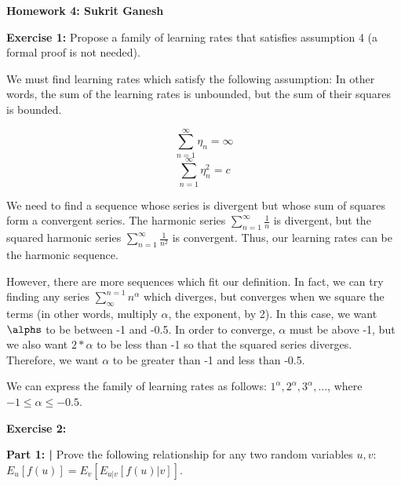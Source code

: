\documentclass{article}
\begin{document}
 
 \begin{center}
     \Huge\textbf{Homework 4: Sukrit Ganesh}\par
 \end{center}
 
  \noindent\makebox[\linewidth]{\rule{\paperwidth}{0.4pt}}\newline
 
 \begin{center}
      \Large\textbf{Exercise 1: }Propose a family of learning rates that satisfies assumption 4 (a formal proof is not needed).\par
 \end{center}
 
 We must find learning rates which satisfy the following assumption:  In other words, the sum of the learning rates is unbounded, but the sum of their
 squares is bounded.
 
 \[\sum_{n=1}^{\infty}{\eta}_{n}=\infty\]
 \[\sum_{n=1}^{\infty}{\eta}_{n}^2=c\]

 We need to find a sequence whose series is divergent but whose sum of squares form a convergent series. The harmonic series $\sum_{n=1}^{\infty}\frac{1}{n}$ is divergent, but the squared harmonic series $\sum_{n=1}^{\infty}\frac{1}{n^2}$ is convergent. Thus, our learning rates can be the harmonic sequence.
 
 However, there are more sequences which fit our definition. In fact, we can try finding any series $\sum^{n=1}_{\infty}n^{\alpha}$ which diverges, but converges when we square the terms (in other words, multiply $\alpha$, the exponent, by 2). In this case, we want $\alphs$ to be between -1 and -0.5. In order to converge, $\alpha$ must be above -1, but we also want $2*\alpha$ to be less than -1 so that the squared series diverges. Therefore, we want $\alpha$ to be greater than -1 and less than -0.5.
 
 We can express the family of learning rates as follows: $1^{\alpha}, 2^{\alpha}, 3^{\alpha}, ...$, where $-1 \leq \alpha \leq -0.5$.
 
 \newpage
 
 \noindent\makebox[\linewidth]{\rule{\paperwidth}{0.4pt}}\newline
 
 \begin{center}
      \Large\textbf{Exercise 2:} \par
 \end{center}
 
 \textbf{Part 1: | }Prove the following relationship for any two random variables $u, v$: $E_u[f(u)]=E_v[E_{u|v}[f(u)|v]]$.\newline
 
\end{document}
